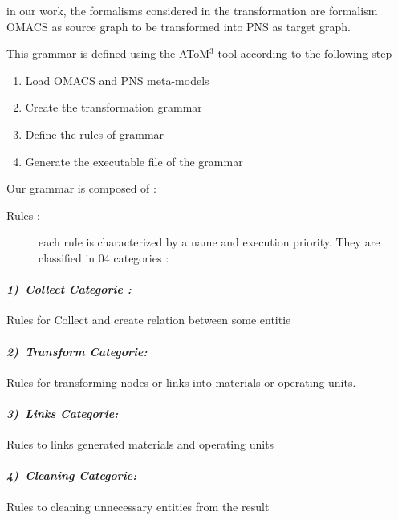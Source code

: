 in our work, the formalisms considered in the transformation are formalism
OMACS as source graph to be transformed into PNS as target graph.

This grammar is defined using the AToM$^3$ tool according to the following step

\begin{enumerate}
	\item Load OMACS and PNS meta-models
	\item Create the transformation grammar
	\item Define the rules of grammar
	\item Generate the executable file of the grammar
\end{enumerate}

Our grammar is composed of :
\begin{description}
	\item [{Rules :}]  each rule is characterized
	by a name and execution priority. They are classified in 04 categories :
\end{description}


\paragraph{\emph{1)~Collect Categorie :} } 
Rules for Collect and create relation between some entitie
 
\paragraph{\emph{2)~Transform Categorie:} } 
Rules for transforming nodes or links into materials or operating units.
 

\paragraph{\emph{3)~Links Categorie:} } 
Rules to links generated materials and operating units 

\paragraph{\emph{4)~Cleaning Categorie:} } 
Rules to cleaning unnecessary entities from the result 

